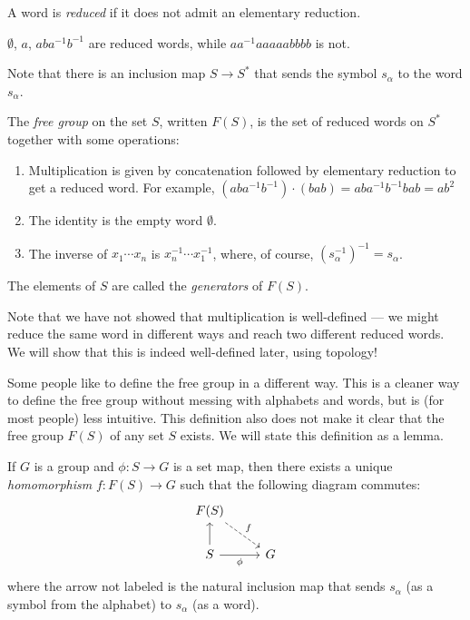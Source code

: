 \documentclass[a4paper]{article}
\begin{document}
\begin{defi}
  A word is \emph{reduced} if it does not admit an elementary reduction.
\end{defi}

\begin{eg}
  $\emptyset$, $a$, $aba^{-1}b^{-1}$ are reduced words, while $aa^{-1}aaaaabbbb$ is not.
\end{eg}
Note that there is an inclusion map $S \to S^*$ that sends the symbol $s_\alpha$ to the word $s_\alpha$.

\begin{defi}
  The \emph{free group} on the set $S$, written $F(S)$, is the set of reduced words on $S^*$ together with some operations:
  \begin{enumerate}
    \item Multiplication is given by concatenation followed by elementary reduction to get a reduced word. For example, $(aba^{-1}b^{-1}) \cdot (bab) = aba^{-1}b^{-1}bab = ab^2$
    \item The identity is the empty word $\emptyset$.
    \item The inverse of $x_1\cdots x_n$ is $x_n^{-1}\cdots x_1^{-1}$, where, of course, $(s_\alpha^{-1})^{-1} = s_\alpha$.
  \end{enumerate}
  The elements of $S$ are called the \emph{generators} of $F(S)$.
\end{defi}
Note that we have not showed that multiplication is well-defined --- we might reduce the same word in different ways and reach two different reduced words. We will show that this is indeed well-defined later, using topology!

Some people like to define the free group in a different way. This is a cleaner way to define the free group without messing with alphabets and words, but is (for most people) less intuitive. This definition also does not make it clear that the free group $F(S)$ of any set $S$ exists. We will state this definition as a lemma.
\begin{lemma}
  If $G$ is a group and $\phi: S\to G$ is a set map, then there exists a unique \emph{homomorphism} $f: F(S) \to G$ such that the following diagram commutes:
  \[
    \begin{tikzcd}
      F(S) \ar[dr, dashed, "f"] \\
      S \ar[u] \ar[r, "\phi"'] & G
    \end{tikzcd}
  \]
  where the arrow not labeled is the natural inclusion map that sends $s_\alpha$ (as a symbol from the alphabet) to $s_\alpha$ (as a word).
\end{lemma}
\end{document}
